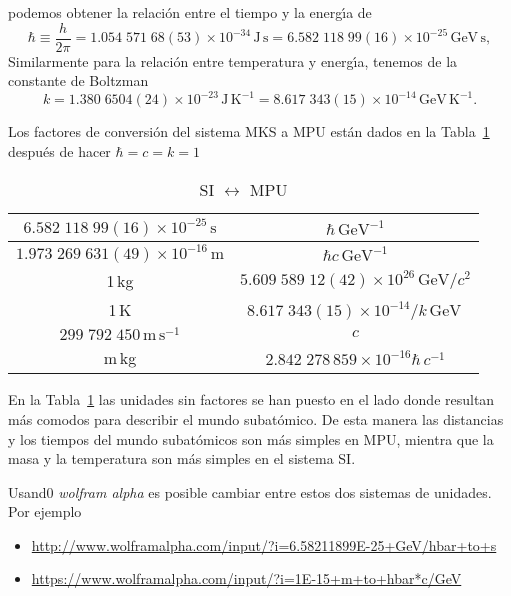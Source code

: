 \begin{frame}
podemos obtener la relaci\'on entre el tiempo y la energ\'\i a de
\begin{equation}
  \hbar\equiv\frac{h}{2\pi}=1.054\;571\;68(53)\times10^{-34}\,\text{J}\,\text{s}
  =6.582\;118\;99(16)\times10^{-25}\,\text{GeV}\,\text{s},
\end{equation}
Similarmente para la relaci\'on entre temperatura y energ\'\i a, tenemos de la constante de Boltzman
\begin{equation}
  k=1.380\;6504(24)\times10^{-23}\,\text{J}\,\text{K}^{-1}=8.617\;343(15)\times10^{-14}\,\text{GeV}\,\text{K}^{-1}.
\end{equation}


Los factores de conversi\'on del sistema MKS a MPU están dados en la Tabla~\ref{tab:mks2mpu} despu\'es de hacer $\hbar=c=k=1$

\begin{table} %
  \centering %
  \begin{tabular}{c|c} %
$6.582\;118\;99(16)\times10^{-25}\,\text{s}$ & $ {\hbar}\,\text{GeV}^{-1}$\\\hline
$1.973\;269\;631(49)\times10^{-16}\,\text{m}$ & $ {\hbar c}\,\text{GeV}^{-1} $\\ \hline
1\,kg& $5.609\;589\;12(42)\times10^{26}\,\text{GeV}/c^2$ \\ \hline
1\,K & $8.617\;343(15)\times10^{-14}/k\,\text{GeV}$\,\\ \hline
$299\;792\;450\,\text{m}\,\text{s}^{-1}$&$c$\\ \hline
m\,kg&$2.842\;278\,859\times10^{-16}\hbar\,c^{-1}$\\ \hline
  \end{tabular} %
  \caption{SI $\leftrightarrow$ MPU} %
  \label{tab:mks2mpu} %
\end{table} %


En la Tabla~\ref{tab:mks2mpu} las unidades sin factores se han puesto en el lado donde resultan más comodos para describir el mundo subatómico. De esta manera las distancias y los tiempos del mundo subatómicos son más simples en MPU, mientra que la masa y la temperatura son más simples en el sistema SI.




Usand0 \emph{wolfram alpha}  es posible cambiar entre estos dos sistemas de unidades. Por ejemplo

\begin{itemize}
\item \url{http://www.wolframalpha.com/input/?i=6.58211899E-25+GeV/hbar+to+s}
\item \url{https://www.wolframalpha.com/input/?i=1E-15+m+to+hbar*c/GeV}
\end{itemize}


\end{frame}
